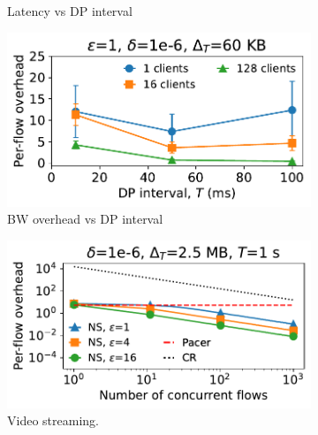 \begin{figure}[t]
\begin{subfigure}{0.49\columnwidth}
      \caption{Latency vs DP interval}
      \label{fig:web-lat-vs-dpInt}
  \end{subfigure}
  \hfill
  \begin{subfigure}{0.49\columnwidth}
      \centering
      \includegraphics[width=\textwidth]{overhead_vs_dp_interval_web_updated.pdf}
      \caption{BW overhead vs DP interval}
      \label{fig:web-overhead-vs-dpInt}
  \end{subfigure}
  \caption{Latency and bandwidth overhead for different
  values of DP interval for video streaming (a, b) and for web (c, d).\\}
  \begin{subfigure}{0.485\columnwidth}
      \centering
      \includegraphics[width=\textwidth]{overhead_vs_number_of_traces_video_bidirectional_loglog_updated.pdf}
      \caption{Video streaming.}
      \label{fig:video-overheads-compare}
  \end{subfigure}
  \hfill
  \begin{subfigure}{0.49\columnwidth}
      \centering

\end{subfigure}
\end{figure}
